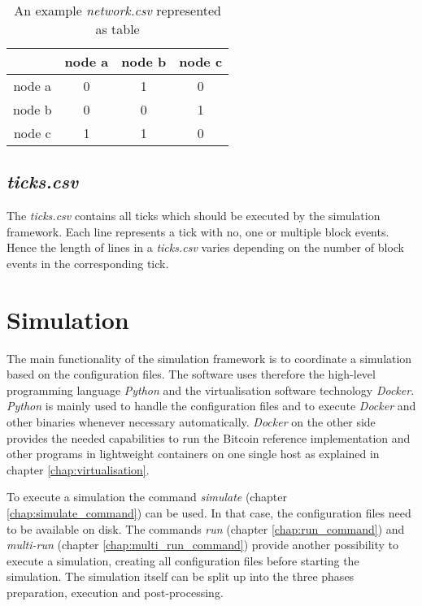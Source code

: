 \begin{table}
  \centering
  \begin{tabular}{c|ccc}
    			& node a 	& node b	& node c	\\
    \hline
    node a		& 0			& 1         & 0         \\
    node b      & 0         & 0         & 1			\\
    node c      & 1         & 1			& 0         \\
  \end{tabular}
  \caption{An example \textit{network.csv} represented as table}
  \label{tab:network_csv}
\end{table}

\subsection{\textit{ticks.csv}}

The \textit{ticks.csv} contains all ticks which should be executed by the simulation framework.
Each line represents a tick with no, one or multiple block events.
Hence the length of lines in a \textit{ticks.csv} varies depending on the number of block events in the corresponding tick.

\section{Simulation}
\label{chap:simulation}

The main functionality of the simulation framework is to coordinate a simulation based on the configuration files.
The software uses therefore the high-level programming language \textit{Python} and the virtualisation software technology \textit{Docker}.
\textit{Python} is mainly used to handle the configuration files and to execute \textit{Docker} and other binaries whenever necessary automatically.
\textit{Docker} on the other side provides the needed capabilities to run the Bitcoin reference implementation and other programs in lightweight containers on one single host as explained in chapter \ref{chap:virtualisation}.
	
To execute a simulation the command \textit{simulate} (chapter \ref{chap:simulate_command}) can be used.
In that case, the configuration files need to be available on disk.
The commands \textit{run} (chapter \ref{chap:run_command}) and \textit{multi-run} (chapter \ref{chap:multi_run_command}) provide another possibility to execute a simulation, creating all configuration files before starting the simulation.
The simulation itself can be split up into the three phases preparation, execution and post-processing.

